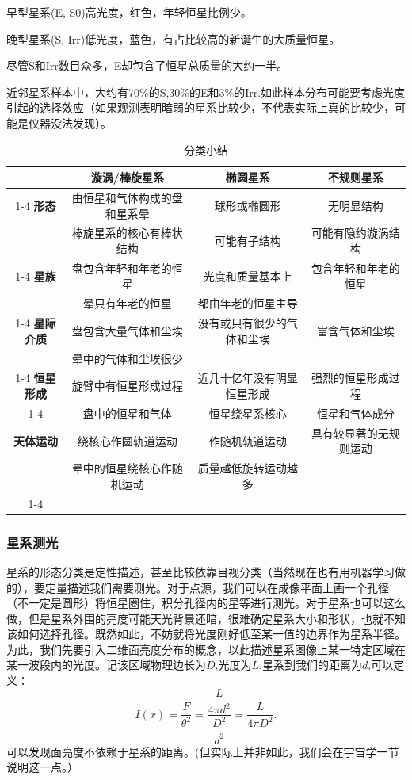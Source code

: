 \documentclass[../天体物理基础.tex]{subfiles}
\begin{document}
早型星系(E, S0)高光度，红色，年轻恒星比例少。

晚型星系(S, Irr)低光度，蓝色，有占比较高的新诞生的大质量恒星。

尽管S和Irr数目众多，E却包含了恒星总质量的大约一半。

近邻星系样本中，大约有70\%的S,30\%的E和3\%的Irr.如此样本分布可能要考虑光度引起的选择效应（如果观测表明暗弱的星系比较少，不代表实际上真的比较少，可能是仪器没法发现）。

\begin{table}[htbp]
\centering
\caption{分类小结}
\begin{tabular}{c c c c}
\hline
 & 漩涡/棒旋星系 & 椭圆星系 & 不规则星系\\
\cline{1-4}
\textbf{形态} & 由恒星和气体构成的盘和星系晕 & 球形或椭圆形 & 无明显结构\\
 & 棒旋星系的核心有棒状结构 & 可能有子结构 & 可能有隐约漩涡结构\\
\cline{1-4}
\textbf{星族} & 盘包含年轻和年老的恒星 & 光度和质量基本上 & 包含年轻和年老的恒星\\
 & 晕只有年老的恒星 & 都由年老的恒星主导 & \\
\cline{1-4}
\textbf{星际介质} & 盘包含大量气体和尘埃 & 没有或只有很少的气体和尘埃 & 富含气体和尘埃\\
 & 晕中的气体和尘埃很少 &  & \\
\cline{1-4}
\textbf{恒星形成} & 旋臂中有恒星形成过程 & 近几十亿年没有明显恒星形成 & 强烈的恒星形成过程\\
\cline{1-4}
 & 盘中的恒星和气体 & 恒星绕星系核心 & 恒星和气体成分\\
\textbf{天体运动} & 绕核心作圆轨道运动 & 作随机轨道运动 & 具有较显著的无规则运动\\
 & 晕中的恒星绕核心作随机运动 & 质量越低旋转运动越多 & \\
\cline{1-4}
\end{tabular}
\label{2}
\end{table}

\subsubsection{星系测光}
星系的形态分类是定性描述，甚至比较依靠目视分类（当然现在也有用机器学习做的），要定量描述我们需要测光。对于点源，我们可以在成像平面上画一个孔径（不一定是圆形）将恒星圈住，积分孔径内的星等进行测光。对于星系也可以这么做，但是星系外围的亮度可能天光背景还暗，很难确定星系大小和形状，也就不知该如何选择孔径。既然如此，不妨就将光度刚好低至某一值的边界作为星系半径。为此，我们先要引入二维面亮度分布的概念，以此描述星系图像上某一特定区域在某一波段内的光度。记该区域物理边长为$D$,光度为$L$,星系到我们的距离为$d$,可以定义：
\begin{equation}
I\left(x\right)=\frac{F}{\theta^{2}}=\dfrac{\dfrac{L}{4\pi{}d^{2}}}{\dfrac{D^{2}}{d^{2}}}=\frac{L}{4\pi{}D^{2}}.\label{1.5.2}
\end{equation}
可以发现面亮度不依赖于星系的距离。(但实际上并非如此，我们会在宇宙学一节说明这一点。）
\end{document}
